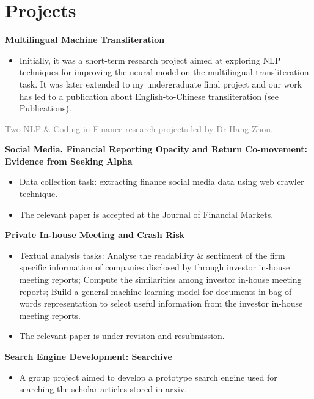 \documentclass[%
               doublesided,
               paper=a4,
               fontsize=11pt
              ]{my-resume}
\begin{document}
\section[\faFolder]{Projects}

\textbf{Multilingual Machine Transliteration}
\smallskip
\begin{itemize}
\item Initially, it was a short-term research project aimed at exploring NLP techniques for improving the neural model on the multilingual transliteration task. It was later extended to my undergraduate final project and our work has led to a publication about English-to-Chinese transliteration (see Publications).
\end{itemize}
\divider

\textcolor{gray}{Two NLP \& Coding in Finance research projects led by Dr Hang Zhou.}
\smallskip

\textbf{Social Media, Financial Reporting Opacity and Return Co-movement: Evidence from Seeking Alpha}
\smallskip
\begin{itemize}
    \item Data collection task: extracting finance social media data using web crawler technique.
    \item The relevant paper is accepted at the Journal of Financial Markets.
\end{itemize}
\smallskip

\textbf{Private In-house Meeting and Crash Risk}
\begin{itemize}
    \item Textual analysis tasks:  Analyse the readability \& sentiment of the firm specific information of companies disclosed by through investor in-house meeting reports; 
     Compute the similarities among investor in-house meeting reports;
     Build a general machine learning model for documents in bag-of-words representation to select useful information from the investor in-house meeting reports.
    \item The relevant paper is under revision and resubmission.
\end{itemize}
\divider

\textbf{Search Engine Development: Searchive}
\smallskip
\begin{itemize}
    \item A group project aimed to develop a prototype search engine used for searching the scholar articles stored in \href{https://arxiv.org/}{arxiv}. 
\end{itemize}
\divider
\end{document}

